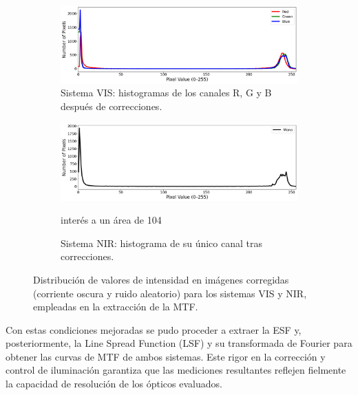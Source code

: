       \begin{figure}[h]
          \centering
          \begin{subfigure}[b]{\linewidth}
              \centering
              \includegraphics[width=\linewidth]{Figures/C4/hist_vis_MTF.png}
              \caption{Sistema VIS: histogramas de los canales R, G y B después de correcciones.}
              \label{fig:histogram_vis}
          \end{subfigure}
          \hfill
          \begin{subfigure}[b]{\linewidth}
              \centering
              \includegraphics[width=\linewidth]{Figures/C4/hist_nir_MTF.png}
              \caption{Sistema NIR: histograma de su único canal tras correcciones.}
              \label{fig:histogram_nir}interés a un área de 104
          \end{subfigure}
          \caption{Distribución de valores de intensidad en imágenes corregidas (corriente oscura y ruido aleatorio) para los sistemas VIS y NIR, empleadas en la extracción de la MTF.}
          \label{fig:histogram_vis_nir}
      \end{figure}
      
      Con estas condiciones mejoradas se pudo proceder a extraer la ESF y, posteriormente, la Line Spread Function (LSF) y su transformada de Fourier para obtener las curvas de MTF de ambos sistemas. Este rigor en la corrección y control de iluminación garantiza que las mediciones resultantes reflejen fielmente la capacidad de resolución de los ópticos evaluados.      %
      
